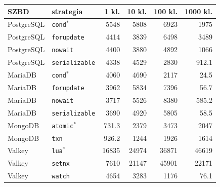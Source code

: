 \begin{tabular}{llrrrr}
\toprule
SZBD & strategia & 1 kl. & 10 kl. & 100 kl. & 1000 kl. \\
\midrule
PostgreSQL & \texttt{cond$^{*}$} & \num{5548} & \num{5808} & \num{6923} & \num{1975} \\
PostgreSQL & \texttt{forupdate} & \num{4414} & \num{3839} & \num{6498} & \num{3489} \\
PostgreSQL & \texttt{nowait} & \num{4400} & \num{3880} & \num{4892} & \num{1066} \\
PostgreSQL & \texttt{serializable} & \num{4338} & \num{4529} & \num{2830} & \num{912.1} \\
MariaDB & \texttt{cond$^{*}$} & \num{4060} & \num{4690} & \num{2117} & \num{24.5} \\
MariaDB & \texttt{forupdate} & \num{3962} & \num{5834} & \num{7396} & \num{56.7} \\
MariaDB & \texttt{nowait} & \num{3717} & \num{5526} & \num{8380} & \num{585.2} \\
MariaDB & \texttt{serializable} & \num{3690} & \num{4920} & \num{5805} & \num{58.5} \\
MongoDB & \texttt{atomic$^{*}$} & \num{731.3} & \num{2379} & \num{3473} & \num{2047} \\
MongoDB & \texttt{txn} & \num{926.2} & \num{1244} & \num{1926} & \num{1614} \\
Valkey & \texttt{lua$^{*}$} & \num{16835} & \num{24974} & \num{36871} & \num{46619} \\
Valkey & \texttt{setnx} & \num{7610} & \num{21147} & \num{45901} & \num{22171} \\
Valkey & \texttt{watch} & \num{4654} & \num{3283} & \num{1176} & \num{76.1} \\
\bottomrule
\end{tabular}
